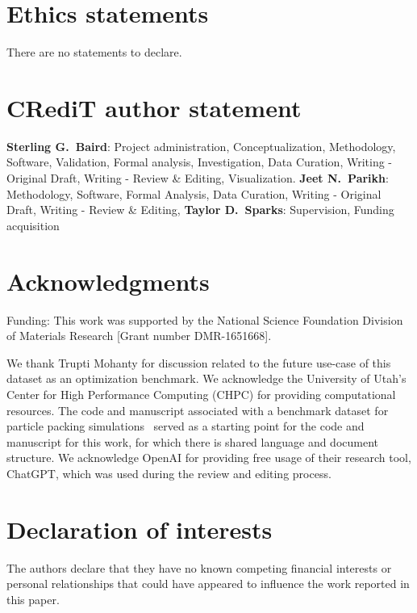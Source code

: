 \documentclass[pdflatex,sn-mathphys-num]{sn-jnl}
\begin{document}
\section*{Ethics statements}

There are no statements to declare.

\section*{CRediT author statement}

\textbf{Sterling G.~Baird}: Project administration, Conceptualization, Methodology, Software, Validation, Formal analysis, Investigation, Data Curation, Writing - Original Draft, Writing - Review \& Editing, Visualization. \textbf{Jeet N.~Parikh}: Methodology, Software, Formal Analysis, Data Curation, Writing - Original Draft, Writing - Review \& Editing, \textbf{Taylor D.~Sparks}: Supervision, Funding acquisition

\section*{Acknowledgments}

Funding: This work was supported by the National Science Foundation Division of Materials Research [Grant number DMR-1651668].

We thank Trupti Mohanty for discussion related to the future use-case of this dataset as an optimization benchmark. We acknowledge the University of Utah's Center for High Performance Computing (CHPC) for providing computational resources. The code and manuscript associated with a benchmark dataset for particle packing simulations~\cite{Existing08_Baird2023_HardSphere} served as a starting point for the code and manuscript for this work, for which there is shared language and document structure. We acknowledge OpenAI for providing free usage of their research tool, ChatGPT, which was used during the review and editing process.

\section*{Declaration of interests}

The authors declare that they have no known competing financial interests or personal relationships that could have appeared to influence the work reported in this paper.


\end{document}
